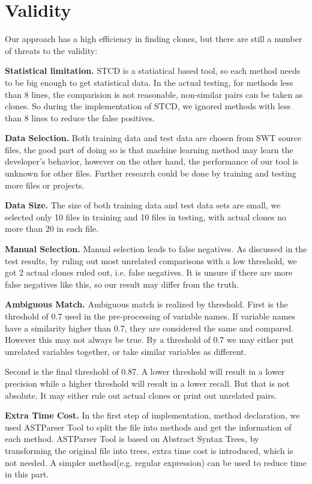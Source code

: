 \documentclass[../main.tex]{subfiles}
\begin{document}
\section{Validity}

Our approach has a high efficiency in finding clones, but there are still a number of threats to the validity:

\textbf{Statistical limitation.} STCD is a statiatical based tool, so each method needs to be big enough to get statistical data. In the actual testing, for methods less than 8 lines, the comparision is not reasonable, non-similar pairs can be taken as clones. So during the implementation of STCD, we ignored methods with less than 8 lines to reduce the false positives.

\textbf{Data Selection.} Both training data and test data are chosen from SWT source files, the good part of doing so is that machine learning method may learn the developer's behavior, however on the other hand, the performance of our tool is unknown for other files. Further research could be done by training and testing more files or projects. 

\textbf{Data Size.} The size of both training data and test data sets are small, we selected only 10 files in training and 10 files in testing, with actual clones no more than 20 in each file. 

\textbf{Manual Selection.} Manual selection leads to false negatives. As discussed in the test results, by ruling out most unrelated comparisons with a low threshold, we got 2 actual clones ruled out, i.e. false negatives. It is unsure if there are more false negatives like this, so our result may differ from the truth.

\textbf{Ambiguous Match.} Ambiguous match is realized by threshold. First is the threshold of 0.7 used in the pre-processing of variable names. If variable names have a similarity higher than 0.7, they are considered the same and compared. However this may not always be true. By a threshold of 0.7 we may either put unrelated variables together, or take similar variables as different.

Second is the final threshold of 0.87. A lower threshold will result in a lower precision while a higher threshold will result in a lower recall. But that is not absolute. It may either rule out actual clones or print out unrelated pairs.

\textbf{Extra Time Cost.} In the first step of implementation, method declaration, we used ASTParser Tool to split the file into methods and get the information of each method. ASTParser Tool is based on Abstract Syntax Trees, by transforming the original file into trees, extra time cost is introduced, which is not needed. A simpler method(e.g. regular expression) can be used to reduce time in this part.
\end{document}
